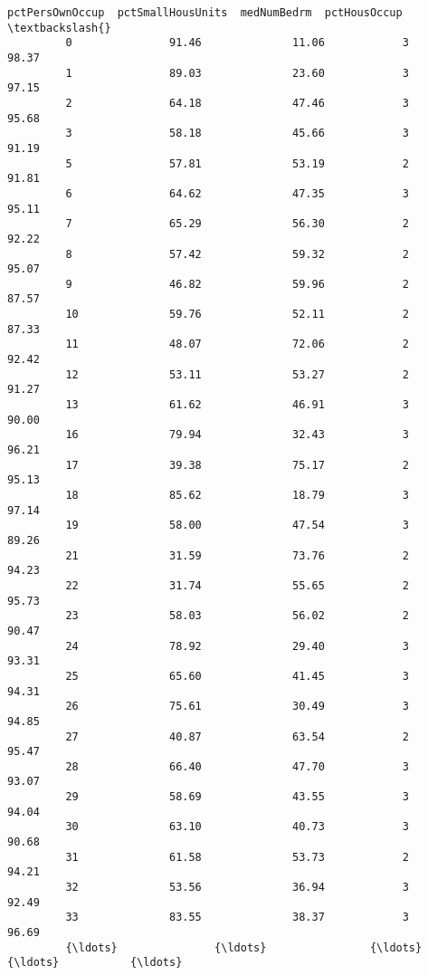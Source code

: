 \documentclass[11pt]{llncs}
\begin{document}
\begin{Verbatim}[commandchars=\\\{\}]
               pctPersOwnOccup  pctSmallHousUnits  medNumBedrm  pctHousOccup  \textbackslash{}
         0               91.46              11.06            3         98.37   
         1               89.03              23.60            3         97.15   
         2               64.18              47.46            3         95.68   
         3               58.18              45.66            3         91.19   
         5               57.81              53.19            2         91.81   
         6               64.62              47.35            3         95.11   
         7               65.29              56.30            2         92.22   
         8               57.42              59.32            2         95.07   
         9               46.82              59.96            2         87.57   
         10              59.76              52.11            2         87.33   
         11              48.07              72.06            2         92.42   
         12              53.11              53.27            2         91.27   
         13              61.62              46.91            3         90.00   
         16              79.94              32.43            3         96.21   
         17              39.38              75.17            2         95.13   
         18              85.62              18.79            3         97.14   
         19              58.00              47.54            3         89.26   
         21              31.59              73.76            2         94.23   
         22              31.74              55.65            2         95.73   
         23              58.03              56.02            2         90.47   
         24              78.92              29.40            3         93.31   
         25              65.60              41.45            3         94.31   
         26              75.61              30.49            3         94.85   
         27              40.87              63.54            2         95.47   
         28              66.40              47.70            3         93.07   
         29              58.69              43.55            3         94.04   
         30              63.10              40.73            3         90.68   
         31              61.58              53.73            2         94.21   
         32              53.56              36.94            3         92.49   
         33              83.55              38.37            3         96.69   
         {\ldots}               {\ldots}                {\ldots}          {\ldots}           {\ldots}   

\end{Verbatim}
\end{document}
